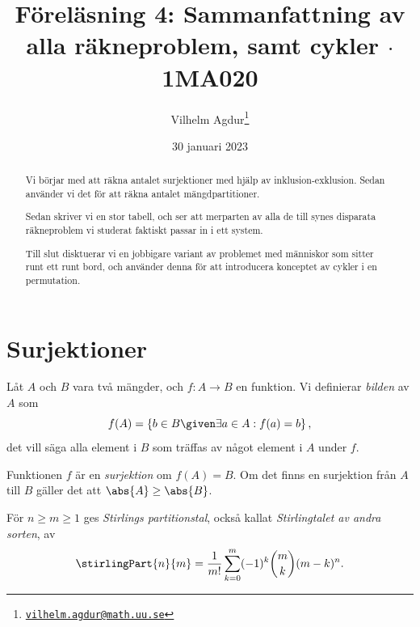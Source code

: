 \documentclass[nobib]{tufte-handout}
\title{Föreläsning 4: Sammanfattning av alla räkneproblem, samt cykler $\cdot$ 1MA020}
\author[Vilhelm Agdur]{Vilhelm Agdur\thanks{\href{mailto:vilhelm.agdur@math.uu.se}{\nolinkurl{vilhelm.agdur@math.uu.se}}}}
\date{30 januari 2023}
\begin{document}

\maketitle%

\begin{abstract}
\noindent
Vi börjar med att räkna antalet surjektioner med hjälp av inklusion-exklusion. Sedan använder vi det för att räkna antalet mängdpartitioner.

Sedan skriver vi en stor tabell, och ser att merparten av alla de till synes disparata räkneproblem vi studerat faktiskt passar in i ett system.

Till slut disktuerar vi en jobbigare variant av problemet med människor som sitter runt ett runt bord, och använder denna för att introducera konceptet av cykler i en permutation.
\end{abstract}

\section{Surjektioner}

\begin{definition}
  Låt $A$ och $B$ vara två mängder, och $f: A \to B$ en funktion. Vi definierar \emph{bilden} av $A$ som
  $$f(A) = \left\{b \in B \given \exists a\in A: f(a) = b\right\},$$
  det vill säga alla element i $B$ som träffas av något element i $A$ under $f$.

  Funktionen $f$ är en \emph{surjektion} om $f(A) = B$. Om det finns en surjektion från $A$ till $B$ gäller det att $\abs{A} \geq \abs{B}$.
\end{definition}

\begin{definition}
  För $n \geq m \geq 1$ ges \emph{Stirlings partitionstal}, också kallat \emph{Stirlingtalet av andra sorten}, av
  $$\stirlingPart{n}{m} = \frac{1}{m!}\sum_{k=0}^{m}(-1)^k\binom{m}{k}(m-k)^n.$$
\end{definition}
\end{document}
